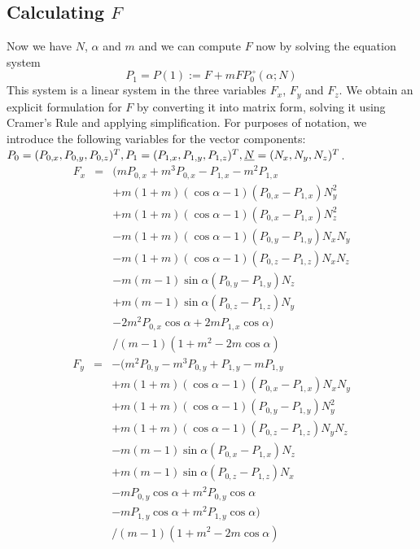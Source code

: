 \documentclass[tikz, journal, letterpaper]{IEEEtran}
\begin{document}
\subsection{Calculating $F$}
Now we have $N$, $\alpha$ and $m$ and we can compute $F$ now by solving the equation system
\begin{equation}
 P_1 = P(1) := F + m FP_0 ^{\;\circ} (\alpha; N)
\label{eq:Feq}
\end{equation}
This system is a linear system in the three variables $F_x$, $F_y$ and $F_z$. We obtain an explicit formulation for $F$ by converting it into matrix form, solving it using Cramer's Rule and applying simplification. For purposes of notation, we introduce the following variables for the vector components: $P_0=(P_{0,x},P_{0,y},P_{0,z})^T, P_1=(P_{1,x},P_{1,y},P_{1,z})^T,\\ \underline{N}=(N_x,N_y,N_z)^T$.
\begin{equation}
\begin{array}{lcl}
	F_x &=& (m P_{0,x} + m^3 P_{0,x} - P_{1,x} - m^2 P_{1,x} \\
		&& + m (1+m) (\cos\alpha - 1) (P_{0,x} - P_{1,x}) N_y^2 \\
		&& + m (1+m) (\cos\alpha - 1) (P_{0,x} - P_{1,x}) N_z^2 \\
		&& - m (1+m) (\cos\alpha - 1) (P_{0,y} - P_{1,y}) N_x N_y \\
		&& - m (1+m) (\cos\alpha - 1) (P_{0,z} - P_{1,z}) N_x N_z \\
		&& - m (m-1) \sin\alpha (P_{0,y} - P_{1,y}) N_z \\
		&& + m (m-1) \sin\alpha (P_{0,z} - P_{1,z}) N_y \\
		&& - 2 m^2 P_{0,x} \cos\alpha + 2 m P_{1,x} \cos\alpha ) \\
		&& / (m-1)(1 + m^2 - 2m\cos\alpha)
\end{array}
\label{eq:Fx}
\end{equation}
\begin{equation}
\begin{array}{lcl}
 F_y &=& -(m^2 P_{0,y} - m^3 P_{0,y} + P_{1,y} - m P_{1,y} \\
		&& + m (1+m) (\cos\alpha - 1) (P_{0,x} - P_{1,x}) N_x N_y \\
		&& + m (1+m) (\cos\alpha - 1) (P_{0,y} - P_{1,y}) N_y^2 \\
		&& + m (1+m) (\cos\alpha - 1) (P_{0,z} - P_{1,z}) N_y N_z \\
		&& - m (m-1) \sin\alpha (P_{0,x} - P_{1,x}) N_z \\
		&& + m (m-1) \sin\alpha (P_{0,z} - P_{1,z}) N_x \\
		&& - m P_{0,y} \cos\alpha + m^2 P_{0,y} \cos\alpha \\
		&& - m P_{1,y} \cos\alpha + m^2 P_{1,y} \cos\alpha) \\
		&& / (m-1)(1 + m^2 - 2m\cos\alpha)
\end{array}
\label{eq:Fy}
\end{equation}
\end{document}
